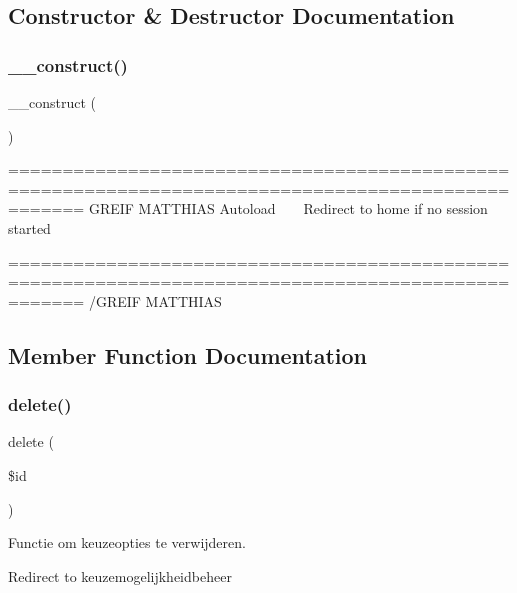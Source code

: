 \subsection{Constructor \& Destructor Documentation}
\mbox{\label{class_keuzeoptie_a095c5d389db211932136b53f25f39685}} 
\subsubsection{\texorpdfstring{\+\_\+\+\_\+construct()}{\_\_construct()}}
{\footnotesize\ttfamily \+\_\+\+\_\+construct (\begin{DoxyParamCaption}{ }\end{DoxyParamCaption})}

=================================================================================================== G\+R\+E\+IF M\+A\+T\+T\+H\+I\+AS Autoload ~\newline
~\newline
 Redirect to home if no session started

=================================================================================================== /\+G\+R\+E\+IF M\+A\+T\+T\+H\+I\+AS 

\subsection{Member Function Documentation}
\mbox{\label{class_keuzeoptie_a2f8258add505482d7f00ea26493a5723}} 
\subsubsection{\texorpdfstring{delete()}{delete()}}
{\footnotesize\ttfamily delete (\begin{DoxyParamCaption}\item[{}]{\$id }\end{DoxyParamCaption})}



Functie om keuzeopties te verwijderen. 

Redirect to keuzemogelijkheidbeheer \mbox{\label{class_keuzeoptie_a50e3bfb586b2f42932a6a93f3fbb0828}} 
